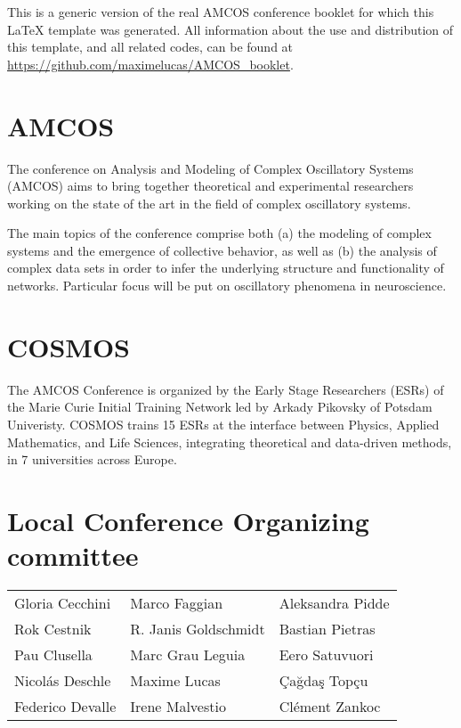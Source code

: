 {\small \textcolor{myblue}{This is a generic version of the real AMCOS conference booklet for which this \LaTeX{} template was generated. All information about the use and distribution of this template, and all related codes, can be found at \url{https://github.com/maximelucas/AMCOS\_booklet}.}}

\section{AMCOS}
The conference on Analysis and Modeling of Complex Oscillatory Systems (AMCOS) aims to bring together theoretical and experimental researchers working on the state of the art in the field of complex oscillatory systems.

The main topics of the conference comprise both (a) the modeling of complex systems and the emergence of collective behavior, as well as (b) the analysis of complex data sets in order to infer the underlying structure and functionality of networks. Particular focus will be put on oscillatory phenomena in neuroscience.

\section{COSMOS}

The AMCOS Conference is organized by the Early Stage Researchers (ESRs) of the Marie Curie Initial Training Network led by Arkady Pikovsky of Potsdam Univeristy. COSMOS trains 15 ESRs at the interface between Physics, Applied Mathematics, and Life Sciences, integrating theoretical and data-driven methods, in 7 universities across Europe.

\section{Local Conference Organizing committee}
\begin{center}
\begin{tabular}{lll}
Gloria Cecchini & Marco Faggian &  Aleksandra Pidde \\
Rok Cestnik & R. Janis Goldschmidt &  Bastian Pietras\\
 Pau Clusella  & Marc Grau Leguia & Eero Satuvuori \\
 Nicolás Deschle & Maxime Lucas   &  Çağdaş Topçu \\
Federico Devalle  & Irene Malvestio  & Clément Zankoc 
\end{tabular}
\end{center}
